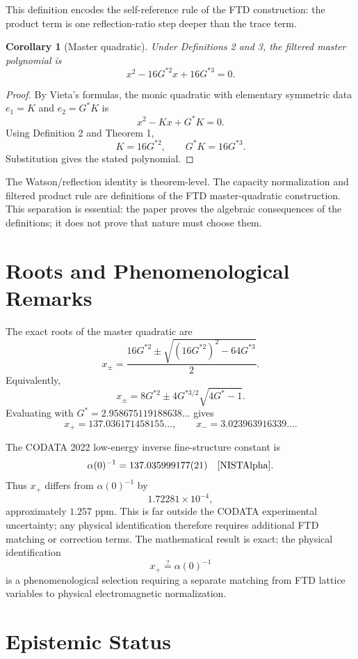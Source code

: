 \documentclass[11pt,letterpaper]{article}
\newtheorem{corollary}{Corollary}
\begin{document}
This definition encodes the self-reference rule of the FTD construction: the
product term is one reflection-ratio step deeper than the trace term.

\begin{corollary}[Master quadratic]
Under Definitions 2 and 3, the filtered master polynomial is
\[
x^2-16G^{*2}x+16G^{*3}=0.
\]
\end{corollary}

\begin{proof}
By Vieta's formulas, the monic quadratic with elementary symmetric data
$e_1=K$ and $e_2=G^*K$ is
\[
x^2-Kx+G^*K=0.
\]
Using Definition 2 and Theorem 1,
\[
K=16G^{*2},\qquad G^*K=16G^{*3}.
\]
Substitution gives the stated polynomial.
\end{proof}

\noindent The Watson/reflection identity is theorem-level. The capacity
normalization and filtered product rule are definitions of the FTD
master-quadratic construction. This separation is essential: the paper proves
the algebraic consequences of the definitions; it does not prove that nature
must choose them.

\section{Roots and Phenomenological Remarks}

The exact roots of the master quadratic are
\[
x_{\pm}=
\frac{16G^{*2}\pm\sqrt{(16G^{*2})^2-64G^{*3}}}{2}.
\]
Equivalently,
\[
x_{\pm}=8G^{*2}\pm4G^{*3/2}\sqrt{4G^*-1}.
\]
Evaluating with
$G^*=2.958675119188638\ldots$ gives
\[
x_+=137.036171458155\ldots,\qquad
x_-=3.023963916339\ldots .
\]

The CODATA 2022 low-energy inverse fine-structure constant is
\[
\alpha(0)^{-1}=137.035999177(21) \quad \cite{NISTAlpha}.
\]
Thus $x_+$ differs from $\alpha(0)^{-1}$ by
\[
1.72281\times 10^{-4},
\]
approximately $1.257$ ppm. This is far outside the CODATA experimental
uncertainty; any physical identification therefore requires additional FTD
matching or correction terms. The mathematical result is exact; the physical
identification
\[
x_+\stackrel{?}{=}\alpha(0)^{-1}
\]
is a phenomenological selection requiring a separate matching from FTD lattice
variables to physical electromagnetic normalization.

\section{Epistemic Status}
\end{document}
